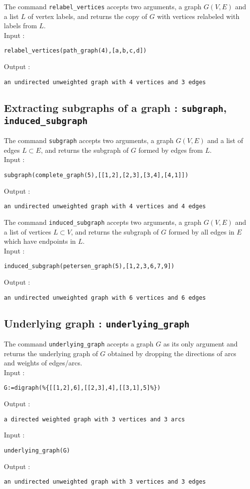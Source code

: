 \documentclass[a4paper,11pt]{article}
\begin{document}
The command {\tt relabel\_vertices} accepts two arguments, a graph $ G(V,E) $ and a list $ L $ of vertex labels, and returns the copy of $ G $ with vertices relabeled with labels from $ L $.\\
Input :
\begin{center}
  \tt relabel\_vertices(path\_graph(4),[a,b,c,d])
\end{center}
Output :
\begin{center}
  \tt an undirected unweighted graph with 4 vertices and 3 edges
\end{center}

\subsection{Extracting subgraphs of a graph : {\tt subgraph}, {\tt induced\_subgraph}}

The command {\tt subgraph} accepts two arguments, a graph $ G(V,E) $ and a list of edges $ L\subset E $, and returns the subgraph of $ G $ formed by edges from $ L $.\\
Input :
\begin{center}
  \tt subgraph(complete\_graph(5),[[1,2],[2,3],[3,4],[4,1]])
\end{center}
Output :
\begin{center}
  \tt an undirected unweighted graph with 4 vertices and 4 edges
\end{center}

The command {\tt induced\_subgraph} accepts two arguments, a graph $ G(V,E) $ and a list of vertices $ L\subset V $, and returns the subgraph of $ G $ formed by all edges in $ E $ which have endpoints in $ L $.\\
Input :
\begin{center}
  \tt induced\_subgraph(petersen\_graph(5),[1,2,3,6,7,9])
\end{center}
Output :
\begin{center}
  \tt an undirected unweighted graph with 6 vertices and 6 edges
\end{center}

\subsection{Underlying graph : {\tt underlying\_graph}}

The command {\tt underlying\_graph} accepts a graph $ G $ as its only argument and returns the underlying graph of $ G $ obtained by dropping the directions of arcs and weights of edges/arcs.\\
Input :
\begin{center}
  \tt G:=digraph(\%\{[[1,2],6],[[2,3],4],[[3,1],5]\%\})
\end{center}
Output :
\begin{center}
  \tt a directed weighted graph with 3 vertices and 3 arcs
\end{center}
Input :
\begin{center}
  \tt underlying\_graph(G)
\end{center}
Output :
\begin{center}
  \tt an undirected unweighted graph with 3 vertices and 3 edges
\end{center}
\end{document}
